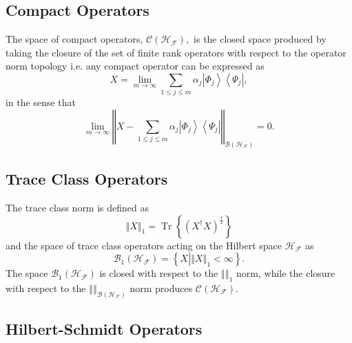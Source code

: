 \documentclass[aps,preprint,amsfonts,amssymb,showpacs,showkeys]{revtex4}%
\begin{document}
\subsection{Compact Operators}

The space of compact operators, $\mathcal{C}\left(  \mathcal{H}_{\mathcal{F}%
}\right)  ,$ is the closed space produced by taking the closure of the set of
finite rank operators with respect to the operator norm topology i.e. any
compact operator can be expressed as
\begin{equation}
X=\lim_{m\rightarrow\infty}\sum_{1\leq j\leq m}\alpha_{j}\left\vert \Phi
_{j}\right\rangle \left\langle \Psi_{j}\right\vert ,
\end{equation}
in the sense that
\begin{equation}
\lim_{m\rightarrow\infty}\left\Vert X-\sum_{1\leq j\leq m}\alpha_{j}\left\vert
\Phi_{j}\right\rangle \left\langle \Psi_{j}\right\vert \right\Vert
_{\mathcal{B}\left(  \mathcal{H}_{\mathcal{F}}\right)  }=0.
\end{equation}


\subsection{Trace Class Operators}

The trace class norm is defined as
\begin{equation}
\left\Vert X\right\Vert _{1}=\operatorname*{Tr}\left\{  \left(  X^{\dagger
}X\right)  ^{\frac{1}{2}}\right\}
\end{equation}
and the space of trace class operators acting on the Hilbert space
$\mathcal{H}_{\mathcal{F}}$ as
\begin{equation}
\mathcal{B}_{1}\left(  \mathcal{H}_{\mathcal{F}}\right)  =\left\{  X\left\vert
\left\Vert X\right\Vert _{1}<\infty\right.  \right\}  .
\end{equation}
The space $\mathcal{B}_{1}\left(  \mathcal{H}_{\mathcal{F}}\right)  $ is
closed with respect to the $\left\Vert {}\right\Vert _{1}$ norm, while the
closure with respect to the $\left\Vert {}\right\Vert _{\mathcal{B}\left(
\mathcal{H}_{\mathcal{F}}\right)  }$ norm produces $\mathcal{C}\left(
\mathcal{H}_{\mathcal{F}}\right)  .$

\subsection{Hilbert-Schmidt Operators}
\end{document}
